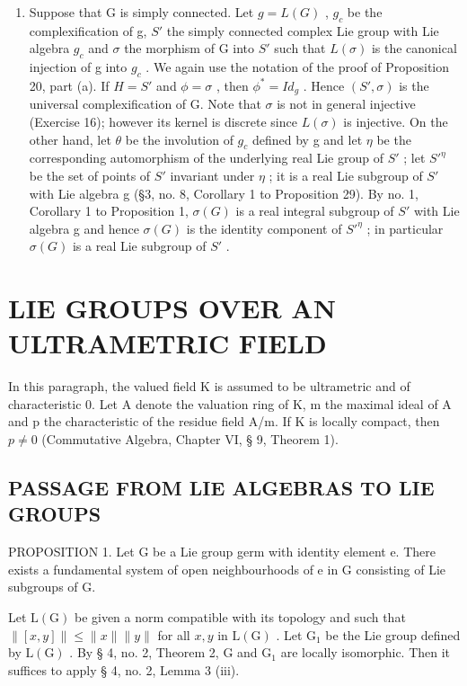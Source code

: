 \begin{enumerate}
\def\labelenumi{(\arabic{enumi})}
\setcounter{enumi}{1}
\tightlist
\item
  Suppose that G is simply connected. Let \(g = L(G)\) , \(g_{c}\) be the complexification of g, \(S'\) the simply connected complex Lie group with Lie algebra \(g_{c}\) and \(\sigma\) the morphism of G into \(S'\) such that \(L(\sigma)\) is the canonical injection of g into \(g_{c}\) . We again use the notation of the proof of Proposition 20, part (a). If \(H = S'\) and \(\phi = \sigma\) , then \(\phi^{*} = I d_{g}\) . Hence \((S', \sigma)\) is the universal complexification of G. Note that \(\sigma\) is not in general injective (Exercise 16); however its kernel is discrete since \(L(\sigma)\) is injective. On the other hand, let \(\theta\) be the involution of \(g_{c}\) defined by g and let \(\eta\) be the corresponding automorphism of the underlying real Lie group of \(S'\) ; let \(S'^{\eta}\) be the set of points of \(S'\) invariant under \(\eta\) ; it is a real Lie subgroup of \(S'\) with Lie algebra g (§3, no. 8, Corollary 1 to Proposition 29). By no. 1, Corollary 1 to Proposition 1, \(\sigma(G)\) is a real integral subgroup of \(S'\) with Lie algebra g and hence \(\sigma(G)\) is the identity component of \(S'^{\eta}\) ; in particular \(\sigma(G)\) is a real Lie subgroup of \(S'\) .
\end{enumerate}

\section{LIE GROUPS OVER AN ULTRAMETRIC FIELD}

In this paragraph, the valued field K is assumed to be ultrametric and of characteristic 0. Let A denote the valuation ring of K, m the maximal ideal of A and p the characteristic of the residue field A/m. If K is locally compact, then \(p \neq 0\) (Commutative Algebra, Chapter VI, § 9, Theorem 1).

\subsection{PASSAGE FROM LIE ALGEBRAS TO LIE GROUPS}

PROPOSITION 1. Let G be a Lie group germ with identity element e. There exists a fundamental system of open neighbourhoods of e in G consisting of Lie subgroups of G.

Let \(\mathrm{L}(\mathrm{G})\) be given a norm compatible with its topology and such that \(\| [x,y]\| \leqslant \| x\| \| y\|\) for all \(x,y\) in \(\mathrm{L}(\mathrm{G})\) . Let \(\mathrm{G}_1\) be the Lie group defined by \(\mathrm{L}(\mathrm{G})\) . By § 4, no. 2, Theorem 2, G and \(\mathrm{G}_1\) are locally isomorphic. Then it suffices to apply § 4, no. 2, Lemma 3 (iii).

